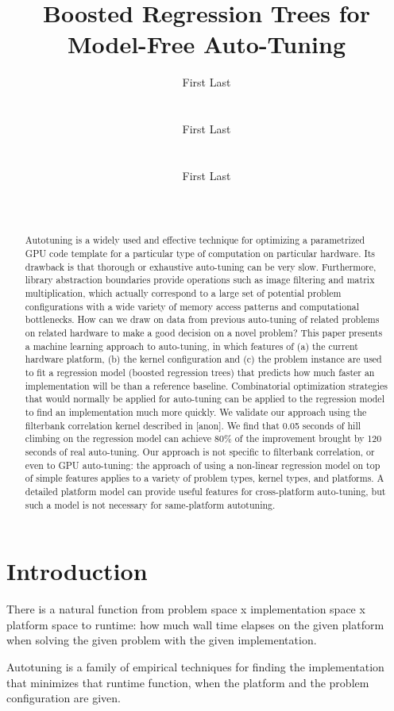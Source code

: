 \documentclass{sig-alternate}
\title{Boosted Regression Trees for Model-Free Auto-Tuning}
\author{
\alignauthor First Last\\
\affaddr{Affiliation line 1}\\
\affaddr{Affiliation line 2}\\
\email{anon@mail.com}
\alignauthor First Last\\
\affaddr{Affiliation line 1}\\
\affaddr{Affiliation line 2}\\
\email{anon@mail.com}
\alignauthor First Last\\
\affaddr{Affiliation line 1}\\
\affaddr{Affiliation line 2}\\
\email{anon@mail.com}
}
\begin{document}
\maketitle

\begin{abstract}
Autotuning is a widely used and effective technique for optimizing a
parametrized GPU code template for a particular type of computation on
particular hardware.
Its drawback is that thorough or exhaustive auto-tuning can be very slow.
Furthermore, library abstraction boundaries provide operations such as image
filtering and matrix multiplication, which actually correspond to a large set
of potential problem configurations with a wide variety of memory
access patterns and computational bottlenecks.
How can we draw on data from previous auto-tuning of related problems on related hardware to make a
good decision on a novel problem?
This paper presents a machine learning approach to auto-tuning, in
which features of
(a) the current hardware platform,
(b) the kernel configuration
and (c) the problem instance are used to fit a regression model (boosted regression trees) that predicts
how much faster an implementation will be than a reference baseline.
Combinatorial optimization strategies that would normally be applied for auto-tuning can be applied to the regression model to find an implementation much more quickly.
We validate our approach using the filterbank correlation kernel described in [anon].
We find that 0.05 seconds of hill climbing on the regression model can achieve
80\% of the improvement brought by 120 seconds of real auto-tuning.
Our approach is not specific to filterbank correlation, or even to GPU auto-tuning: the approach of using a non-linear regression model on top of simple features applies to a variety of problem types, kernel types, and platforms.
A detailed platform model can provide useful features for
cross-platform auto-tuning, but such a model is not necessary for same-platform autotuning.
\end{abstract}


\section{Introduction}

There is a natural function from
problem space x implementation space x platform space to runtime:
how much wall time elapses on the given platform when solving the given
problem with the given implementation.

Autotuning is a family of empirical techniques for finding the implementation
that minimizes that runtime function, when the platform and the problem
configuration are given.
\end{document}
